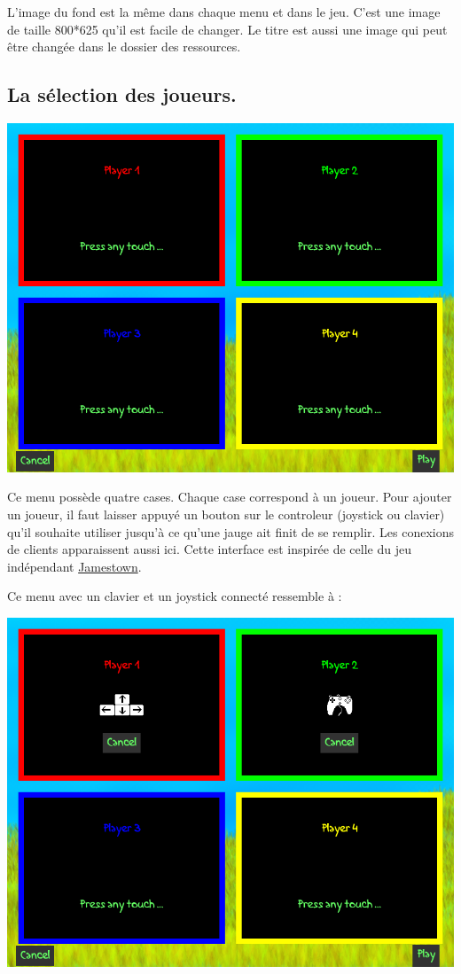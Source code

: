 \documentclass{article}
\begin{document}
L'image du fond est la même dans chaque menu et dans le jeu. C'est une image de taille 800*625 qu'il est facile de changer. Le titre est aussi une image qui peut être changée dans le dossier des ressources.

\subsection{La sélection des joueurs.} \label{select}
\begin{center}
	\includegraphics[scale=0.4]{img/empty.png}
\end{center}
Ce menu possède quatre cases. Chaque case correspond à un joueur. Pour ajouter un joueur, il faut laisser appuyé un bouton sur le controleur (joystick ou clavier) qu'il souhaite utiliser jusqu'à ce qu'une jauge ait finit de se remplir. Les conexions de clients apparaissent aussi ici. Cette interface est inspirée de celle du jeu indépendant \href{http://finalformgames.com/jamestown/}{Jamestown}.

Ce menu avec un clavier et un joystick connecté ressemble à :
\begin{center}
	\includegraphics[scale=0.4]{img/full.png}
\end{center}
\end{document}
